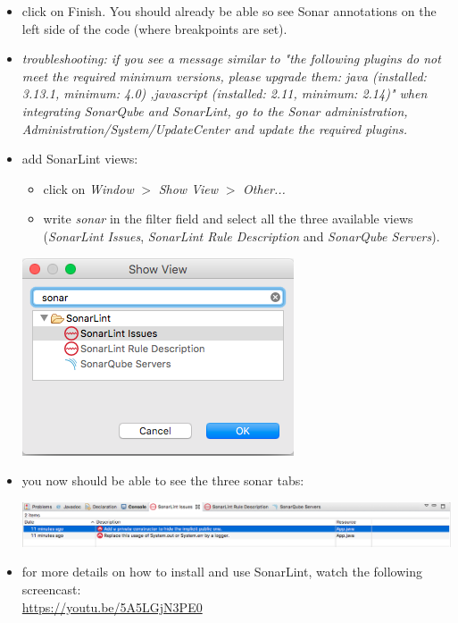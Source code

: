 \documentclass{article}
\begin{document}
\begin{itemize}
\item click on Finish. You should already be able so see Sonar annotations on the left side of the code (where breakpoints are set).
\item \em{troubleshooting: } if you see a message similar to "the following plugins do not meet the required minimum versions, please upgrade them: java (installed: 3.13.1, minimum: 4.0) ,javascript (installed: 2.11, minimum: 2.14)" when integrating SonarQube and SonarLint, go to the Sonar administration, Administration/System/UpdateCenter and update the required plugins.
\item add SonarLint views:
\begin{itemize}
	\item click on \textit{Window} $ > $ \textit{Show View} $ > $ \textit{Other...} 
	\item write \textit{sonar} in the filter field and select all the three available views (\textit{SonarLint Issues}, \textit{SonarLint Rule Description} and \textit{SonarQube Servers}).
\end{itemize}
\begin{center}
	\includegraphics[scale=0.5]{figures/ss9.png}
\end{center}
\item you now should be able to see the three sonar tabs:
\begin{center}
\includegraphics[width=0.9\linewidth]{figures/ss10.png}
\end{center}
\item for more details on how to install and use SonarLint, watch the following screencast: \\
  \url{https://youtu.be/5A5LGjN3PE0}
\end{itemize}
\end{document}
